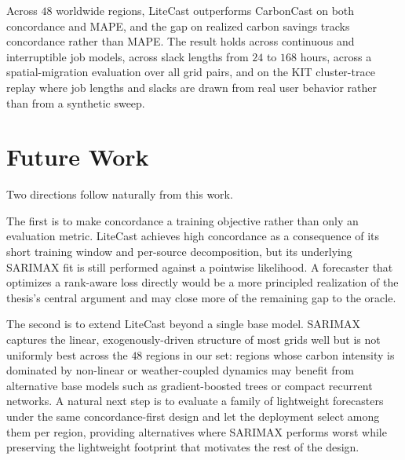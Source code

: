 Across $48$ worldwide regions, LiteCast outperforms CarbonCast on both concordance and MAPE, and the gap on realized carbon savings tracks concordance rather than MAPE.
The result holds across continuous and interruptible job models, across slack lengths from $24$ to $168$ hours, across a spatial-migration evaluation over all grid pairs, and on the KIT cluster-trace replay where job lengths and slacks are drawn from real user behavior rather than from a synthetic sweep.

\section{Future Work}
\label{sec:conclusion-future-work}

Two directions follow naturally from this work.

The first is to make concordance a training objective rather than only an evaluation metric.
LiteCast achieves high concordance as a consequence of its short training window and per-source decomposition, but its underlying SARIMAX fit is still performed against a pointwise likelihood.
A forecaster that optimizes a rank-aware loss directly would be a more principled realization of the thesis's central argument and may close more of the remaining gap to the oracle.

The second is to extend LiteCast beyond a single base model.
SARIMAX captures the linear, exogenously-driven structure of most grids well but is not uniformly best across the $48$ regions in our set: regions whose carbon intensity is dominated by non-linear or weather-coupled dynamics may benefit from alternative base models such as gradient-boosted trees or compact recurrent networks.
A natural next step is to evaluate a family of lightweight forecasters under the same concordance-first design and let the deployment select among them per region, providing alternatives where SARIMAX performs worst while preserving the lightweight footprint that motivates the rest of the design.
